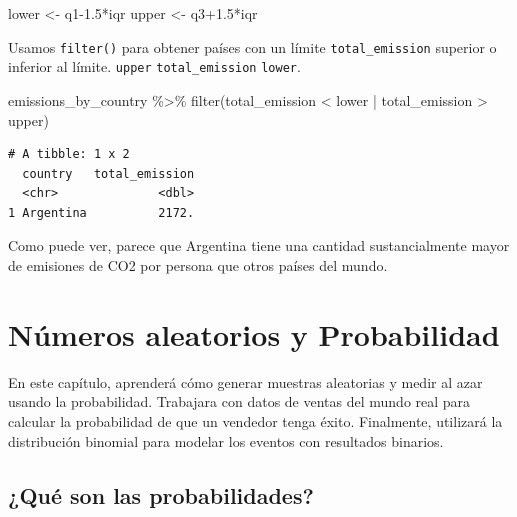 \documentclass[
  letterpaper,
  DIV=11,
  numbers=noendperiod]{scrreprt}
\newenvironment{Shaded}{\begin{snugshade}}{\end{snugshade}}
\newcommand{\FloatTok}[1]{\textcolor[rgb]{0.68,0.00,0.00}{#1}}
\newcommand{\FunctionTok}[1]{\textcolor[rgb]{0.28,0.35,0.67}{#1}}
\newcommand{\NormalTok}[1]{\textcolor[rgb]{0.00,0.23,0.31}{#1}}
\newcommand{\OtherTok}[1]{\textcolor[rgb]{0.00,0.23,0.31}{#1}}
\newcommand{\SpecialCharTok}[1]{\textcolor[rgb]{0.37,0.37,0.37}{#1}}
\begin{document}
\begin{Shaded}
\begin{Highlighting}[]
\NormalTok{lower }\OtherTok{\textless{}{-}}\NormalTok{ q1}\FloatTok{{-}1.5}\SpecialCharTok{*}\NormalTok{iqr}
\NormalTok{upper }\OtherTok{\textless{}{-}}\NormalTok{ q3}\FloatTok{+1.5}\SpecialCharTok{*}\NormalTok{iqr}
\end{Highlighting}
\end{Shaded}

Usamos \texttt{filter()} para obtener países con un límite
\texttt{total\_emission} superior o inferior al límite. \texttt{upper}
\texttt{total\_emission} \texttt{lower}.

\begin{Shaded}
\begin{Highlighting}[]
\NormalTok{emissions\_by\_country }\SpecialCharTok{\%\textgreater{}\%}
  \FunctionTok{filter}\NormalTok{(total\_emission }\SpecialCharTok{\textless{}}\NormalTok{ lower }\SpecialCharTok{|}\NormalTok{ total\_emission }\SpecialCharTok{\textgreater{}}\NormalTok{ upper)}
\end{Highlighting}
\end{Shaded}

\begin{verbatim}
# A tibble: 1 x 2
  country   total_emission
  <chr>              <dbl>
1 Argentina          2172.
\end{verbatim}

Como puede ver, parece que Argentina tiene una cantidad sustancialmente
mayor de emisiones de CO2 por persona que otros países del mundo.


\hypertarget{nuxfameros-aleatorios-y-probabilidad}{%
\chapter{Números aleatorios y
Probabilidad}\label{nuxfameros-aleatorios-y-probabilidad}}

En este capítulo, aprenderá cómo generar muestras aleatorias y medir al
azar usando la probabilidad. Trabajara con datos de ventas del mundo
real para calcular la probabilidad de que un vendedor tenga éxito.
Finalmente, utilizará la distribución binomial para modelar los eventos
con resultados binarios.

\hypertarget{quuxe9-son-las-probabilidades}{%
\section{¿Qué son las
probabilidades?}\label{quuxe9-son-las-probabilidades}}
\end{document}
